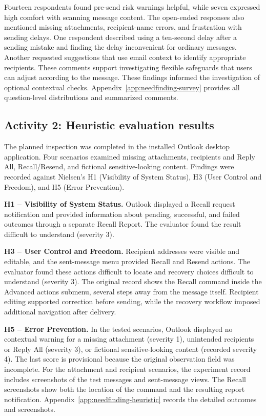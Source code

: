 \documentclass[letterpaper]{jdf}
\begin{document}
Fourteen respondents found pre-send risk warnings helpful, while seven expressed high comfort with scanning message content. The open-ended responses also mentioned missing attachments, recipient-name errors, and frustration with sending delays. One respondent described using a ten-second delay after a sending mistake and finding the delay inconvenient for ordinary messages. Another requested suggestions that use email context to identify appropriate recipients. These comments support investigating flexible safeguards that users can adjust according to the message. These findings informed the investigation of optional contextual checks. Appendix~\ref{app:needfinding-survey} provides all question-level distributions and summarized comments.

\subsection{Activity 2: Heuristic evaluation results}
The planned inspection was completed in the installed Outlook desktop application. Four scenarios examined missing attachments, recipients and Reply All, Recall/Resend, and fictional sensitive-looking content. Findings were recorded against Nielsen's H1 (Visibility of System Status), H3 (User Control and Freedom), and H5 (Error Prevention).

\textbf{H1 -- Visibility of System Status.} Outlook displayed a Recall request notification and provided information about pending, successful, and failed outcomes through a separate Recall Report. The evaluator found the result difficult to understand (severity 3).

\textbf{H3 -- User Control and Freedom.} Recipient addresses were visible and editable, and the sent-message menu provided Recall and Resend actions. The evaluator found these actions difficult to locate and recovery choices difficult to understand (severity 3). The original record shows the Recall command inside the Advanced actions submenu, several steps away from the message itself. Recipient editing supported correction before sending, while the recovery workflow imposed additional navigation after delivery.

\textbf{H5 -- Error Prevention.} In the tested scenarios, Outlook displayed no contextual warning for a missing attachment (severity 1), unintended recipients or Reply All (severity 3), or fictional sensitive-looking content (recorded severity 4). The last score is provisional because the original observation field was incomplete. For the attachment and recipient scenarios, the experiment record includes screenshots of the test messages and sent-message views. The Recall screenshots show both the location of the command and the resulting report notification. Appendix~\ref{app:needfinding-heuristic} records the detailed outcomes and screenshots.
\end{document}
